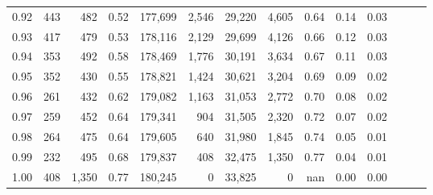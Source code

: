 \begin{tabular}{rrrrrrrrrrrrrr}
0.92 &    443 &    482 &  0.52 &  177,699 &    2,546 &  29,220 &   4,605 &  0.64 &  0.14 &      0.03 \\
0.93 &    417 &    479 &  0.53 &  178,116 &    2,129 &  29,699 &   4,126 &  0.66 &  0.12 &      0.03 \\
0.94 &    353 &    492 &  0.58 &  178,469 &    1,776 &  30,191 &   3,634 &  0.67 &  0.11 &      0.03 \\
0.95 &    352 &    430 &  0.55 &  178,821 &    1,424 &  30,621 &   3,204 &  0.69 &  0.09 &      0.02 \\
0.96 &    261 &    432 &  0.62 &  179,082 &    1,163 &  31,053 &   2,772 &  0.70 &  0.08 &      0.02 \\
0.97 &    259 &    452 &  0.64 &  179,341 &      904 &  31,505 &   2,320 &  0.72 &  0.07 &      0.02 \\
0.98 &    264 &    475 &  0.64 &  179,605 &      640 &  31,980 &   1,845 &  0.74 &  0.05 &      0.01 \\
0.99 &    232 &    495 &  0.68 &  179,837 &      408 &  32,475 &   1,350 &  0.77 &  0.04 &      0.01 \\
1.00 &    408 &  1,350 &  0.77 &  180,245 &        0 &  33,825 &       0 &   nan &  0.00 &      0.00 \\
\bottomrule
\end{tabular}
